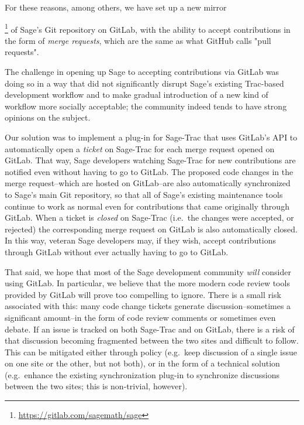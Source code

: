 For these reasons, among others, we have set up a new
mirror{\footnote{\url{https://gitlab.com/sagemath/sage}} of Sage's Git
repository on GitLab, with the ability to accept contributions in the form of
{\em merge requests}, which are the same as what GitHub calls "pull requests".

The challenge in opening up Sage to accepting contributions via GitLab was
doing so in a way that did not significantly disrupt Sage's existing Trac-based
development workflow and to make gradual introduction of a new kind of workflow
more socially acceptable; the community indeed tends to have strong opinions on
the subject.

Our solution was to implement a plug-in for Sage-Trac that uses GitLab's API to
automatically open a {\em ticket} on Sage-Trac for each merge request opened on
GitLab.  That way, Sage developers watching Sage-Trac for new contributions are
notified even without having to go to GitLab.  The proposed code changes in the
merge request--which are hosted on GitLab--are also automatically synchronized
to Sage's main Git repository, so that all of Sage's existing maintenance tools
continue to work as normal even for contributions that came originally through
GitLab.  When a ticket is {\em closed} on Sage-Trac (i.e.~the changes were
accepted, or rejected) the corresponding merge request on GitLab is also
automatically closed.  In this way, veteran Sage developers may, if they wish,
accept contributions through GitLab without ever actually having to go to
GitLab.

That said, we hope that most of the Sage development community {\em will}
consider using GitLab.  In particular, we believe that the more modern code
review tools provided by GitLab will prove too compelling to ignore.  There
is a small risk associated with this: many code change tickets generate
discussion--sometimes a significant amount--in the form of code review comments
or sometimes even debate.  If an issue is tracked on both Sage-Trac and on
GitLab, there is a risk of that discussion becoming fragmented between the two
sites and difficult to follow.  This can be mitigated either through policy
(e.g.~keep discussion of a single issue on one site or the other, but not
both), or in the form of a technical solution (e.g.~enhance the existing
synchronization plug-in to synchronize discussions between the two sites; this
is non-trivial, however).

}
